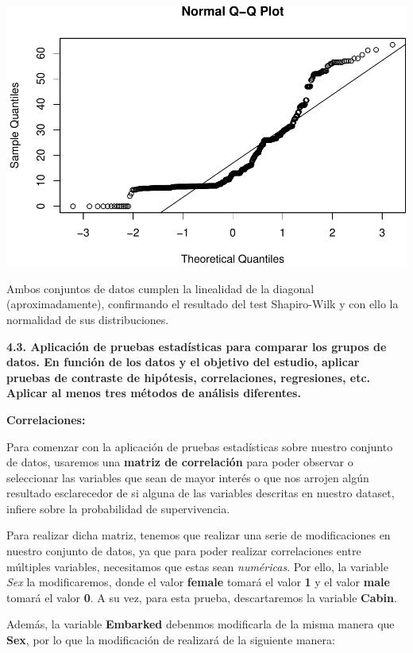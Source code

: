 \documentclass[]{article}
\begin{document}
\includegraphics{titanic_data_analysis_PRA2_files/figure-latex/unnamed-chunk-20-1.pdf}

Ambos conjuntos de datos cumplen la linealidad de la diagonal
(aproximadamente), confirmando el resultado del test Shapiro-Wilk y con
ello la normalidad de sus distribuciones.

\textbf{4.3. Aplicación de pruebas estadísticas para comparar los grupos
de datos. En función de los datos y el objetivo del estudio, aplicar
pruebas de contraste de hipótesis, correlaciones, regresiones, etc.
Aplicar al menos tres métodos de análisis diferentes.}

\textbf{Correlaciones:}

Para comenzar con la aplicación de pruebas estadísticas sobre nuestro
conjunto de datos, usaremos una \textbf{matriz de correlación} para
poder observar o seleccionar las variables que sean de mayor interés o
que nos arrojen algún resultado esclarecedor de si alguna de las
variables descritas en nuestro dataset, infiere sobre la probabilidad de
supervivencia.

Para realizar dicha matriz, tenemos que realizar una serie de
modificaciones en nuestro conjunto de datos, ya que para poder realizar
correlaciones entre múltiples variables, necesitamos que estas sean
\emph{numéricas}. Por ello, la variable \emph{Sex} la modificaremos,
donde el valor \textbf{female} tomará el valor \textbf{1} y el valor
\textbf{male} tomará el valor \textbf{0}. A su vez, para esta prueba,
descartaremos la variable \textbf{Cabin}.

Además, la variable \textbf{Embarked} debenmos modificarla de la misma
manera que \textbf{Sex}, por lo que la modificación de realizará de la
siguiente manera:
\end{document}
